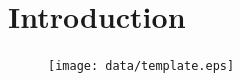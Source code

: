 \documentclass[a4paper]{article}
\begin{document}
\newpage
\unboldmath{\tableofcontents}
\newpage

\section{Introduction}
\begin{figure}[h]
\centering
\texttt{[image: data/template.eps]}
\end{figure}



\end{document}
